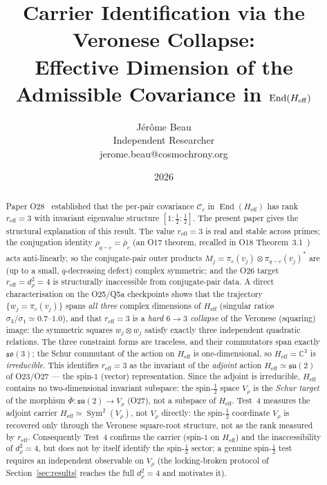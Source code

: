 \documentclass[12pt,a4paper]{article}
\title{Carrier Identification via the Veronese Collapse:\\
Effective Dimension of the Admissible Covariance in $\End(\Heff)$}
\author{J\'er\^ome Beau\\
\small Independent Researcher\\
\small jerome.beau@cosmochrony.org}
\date{2026}
\theoremstyle{remark}
\DeclareMathOperator{\Sym}{Sym}
\DeclareMathOperator{\End}{End}
\newcommand{\su}{\mathfrak{su}}
\newcommand{\Heff}{H_{\mathrm{eff}}}
\newcommand{\Vrho}{V_{\rho}}
\newcommand{\Cc}{\mathcal{C}_c}
\newcommand{\reff}{r_{\mathrm{eff}}}
\begin{document}
  \maketitle

  \begin{abstract}
    Paper O28~\cite{Beau2026a32} established that the per-pair covariance $\Cc$ in $\End(\Heff)$ has rank $\reff = 3$
    with invariant eigenvalue structure $[1 : \tfrac{1}{2} : \tfrac{1}{2}]$.
    The present paper gives the structural explanation of this result.
    The value $\reff = 3$ is real and stable across primes; the conjugation identity
    $\rho_{q-c} = \bar{\rho}_c$ (an O17 theorem, recalled in O18 Theorem~3.1~\cite{Beau2026a22})
    acts anti-linearly, so the conjugate-pair outer products
    $M_j = \pi_c(v_j) \otimes \pi_{q-c}(v_j)^{*}$ are (up to a small, $q$-decreasing defect) complex symmetric; and the
    O26 target $\reff = d_\rho^2 = 4$ is structurally inaccessible from conjugate-pair data.
    A direct characterisation on the O25/Q5a checkpoints shows that the trajectory
    $\{w_j = \pi_c(v_j)\}$ spans \emph{all three} complex dimensions of $\Heff$ (singular ratios
    $\sigma_3/\sigma_1 \simeq 0.7\text{--}1.0$), and that $\reff = 3$ is a \emph{hard $6 \to 3$ collapse} of the
    Veronese (squaring) image: the symmetric squares $w_j \otimes w_j$ satisfy exactly three independent quadratic
    relations.
    The three constraint forms are traceless, and their commutators span exactly $\mathfrak{so}(3)$; the Schur
    commutant of the action on $\Heff$ is one-dimensional, so $\Heff = \mathbb{C}^3$ is \emph{irreducible}.
    This identifies $\reff = 3$ as the invariant of the \emph{adjoint} action $\Heff \simeq \su(2)$ of O23/O27 ---
    the spin-$1$ (vector) representation.
    Since the adjoint is irreducible, $\Heff$ contains no two-dimensional invariant subspace: the spin-$\tfrac{1}{2}$
    space $\Vrho$ is the \emph{Schur target} of the morphism $\bar\Phi : \su(2) \to \Vrho$ (O27), not a subspace of
    $\Heff$.
    Test~4 measures the adjoint carrier $\Heff \simeq \Sym^2(\Vrho)$, not $\Vrho$ directly: the spin-$\tfrac{1}{2}$
    coordinate $\Vrho$ is recovered only through the Veronese square-root structure, not as the rank measured by
    $\reff$.
    Consequently Test~4 confirms the carrier (spin-$1$ on $\Heff$) and the inaccessibility of $d_\rho^2 = 4$, but does
    not by itself identify the spin-$\tfrac{1}{2}$ sector; a genuine spin-$\tfrac{1}{2}$ test requires an independent
    observable on $\Vrho$ (the locking-broken protocol of Section~\ref{sec:results} reaches the full $d_\rho^2 = 4$ and
    motivates it).
  \end{abstract}
\end{document}
